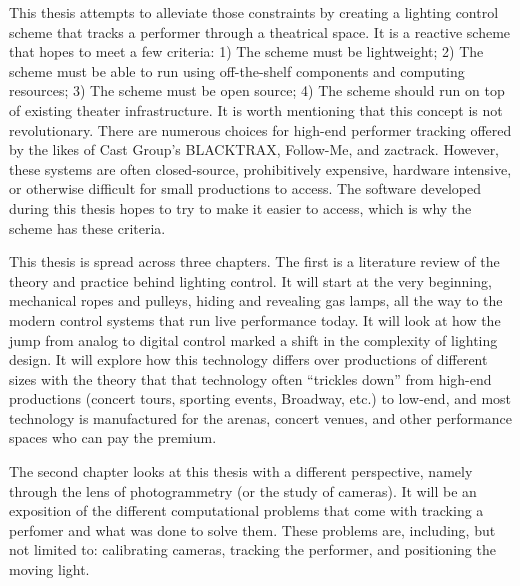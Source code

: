 \documentclass[
    12pt,
    twoside,
    bibstyle=chicago,
    headerstyle=uppercase,
	bibfile=thesis_updating.bib
]{reedthesis}
\begin{document}

    This thesis attempts to alleviate those constraints by creating a lighting control scheme that tracks a performer through a theatrical space. It is a reactive scheme that hopes to meet a few criteria: 1) The scheme must be lightweight; 2) The scheme must be able to run using off-the-shelf components and computing resources; 3) The scheme must be open source; 4) The scheme should run on top of existing theater infrastructure. It is worth mentioning that this concept is not revolutionary. There are numerous choices for high-end performer tracking offered by the likes of Cast Group's BLACKTRAX, Follow-Me, and zactrack. However, these systems are often closed-source, prohibitively expensive, hardware intensive, or otherwise difficult for small productions to access. The software developed during this thesis hopes to try to make it easier to access, which is why the scheme has these criteria. 
    
    
    This thesis is spread across three chapters. The first is a literature review of the theory and practice behind lighting control. It will start at the very beginning, mechanical ropes and pulleys, hiding and revealing gas lamps, all the way to the modern control systems that run live performance today. It will look at how the jump from analog to digital control marked a shift in the complexity of lighting design. It will explore how this technology differs over productions of different sizes with the theory that that technology often “trickles down” from high-end productions (concert tours, sporting events, Broadway, etc.) to low-end, and most technology is manufactured for the arenas, concert venues, and other performance spaces who can pay the premium.
    
    
    The second chapter looks at this thesis with a different perspective, namely through the lens of photogrammetry (or the study of cameras). It will be an exposition of the different computational problems that come with tracking a perfomer and what was done to solve them. These problems are, including, but not limited to: calibrating cameras, tracking the performer, and positioning the moving light.
    
\end{document}
